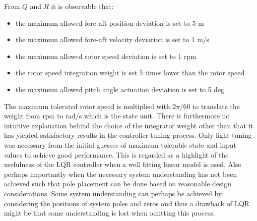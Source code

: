 From $ Q $ and $ R $ it is observable that:
\begin{itemize}
	\item the maximum allowed fore-aft position deviation is set to 5 m
	\item the maximum allowed fore-aft velocity deviation is set to 1 m/s
	\item the maximum allowed rotor speed deviation is set to 1 rpm
	\item the rotor speed integration weight is set 5 times lower than the rotor speed
	\item the maximum allowed pitch angle actuation deviation is set to 5 deg
\end{itemize}
The maximum tolerated rotor speed is multiplied with $ 2 \pi $/$ 60 $ to translate the weight from rpm to rad/s which is the state unit. There is furthermore no intuitive explanation behind the choice of the integrator weight other than that it has yielded satisfactory results in the controller tuning process. Only light tuning was necessary from the initial guesses of maximum tolerable state and input values to achieve good performance. This is regarded as a highlight of the usefulness of the LQR controller when a well fitting linear model is used. Also perhaps importantly when the necessary system understanding has not been achieved such that pole placement can be done based on reasonable design considerations. Some system understanding can perhaps be achieved by considering the positions of system poles and zeros and thus a drawback of LQR might be that some understanding is lost when omitting this process.






